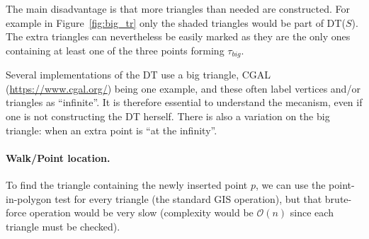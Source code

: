 The main disadvantage is that more triangles than needed are constructed. 
For example in Figure~\ref{fig:big_tr} only the shaded triangles would be part of DT($S$). 
The extra triangles can nevertheless be easily marked as they are the only ones containing at least one of the three points forming $\tau_{big}$. 

\begin{myfloat}
\begin{practice-box}
Several implementations of the DT use a big triangle,  CGAL (\url{https://www.cgal.org/}) being one example, and these often label vertices and/or triangles as ``infinite''.
It is therefore essential to understand the mecanism, even if one is not constructing the DT herself.
There is also a variation on the big triangle: when an extra point is ``at the infinity''.
\end{practice-box}
\end{myfloat}


\paragraph{Walk/Point location.} 
\label{sec:dtwalk}

To find the triangle containing the newly inserted point $p$, we can use the point-in-polygon test for every triangle (the standard GIS operation), but that brute-force operation would be very slow (complexity would be $\mathcal{O}(n)$ since each triangle must be checked).

